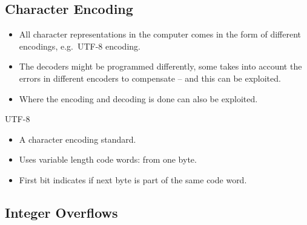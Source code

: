 \subsection{Character Encoding}

\begin{frame}
  \begin{itemize}
    \item All character representations in the computer comes in the form of 
      different encodings, e.g.\ UTF-8 encoding.

    \item The decoders might be programmed differently, some takes into account 
      the errors in different encoders to compensate -- and this can be 
      exploited.

    \item Where the encoding and decoding is done can also be exploited.

  \end{itemize}
\end{frame}

\begin{frame}
  \begin{block}{UTF-8}
    \begin{itemize}
      \item A character encoding standard.
      \item Uses variable length code words: from one byte.
      \item First bit indicates if next byte is part of the same code word.
    \end{itemize}
  \end{block}
\end{frame}


\subsection{Integer Overflows}

\begin{frame}[fragile]
  \inputminted{C}{combine.c}
\end{frame}


